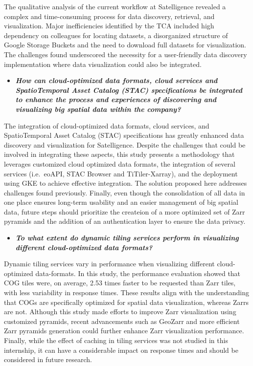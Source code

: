 \documentclass[
  oneside,
  open=any]{scrbook}
\providecommand{\tightlist}{%
  \setlength{\itemsep}{0pt}\setlength{\parskip}{0pt}}\usepackage{longtable,booktabs,array}
\begin{document}
The qualitative analysis of the current workflow at Satelligence
revealed a complex and time-consuming process for data discovery,
retrieval, and visualization. Major inefficiencies identified by the TCA
included high dependency on colleagues for locating datasets, a
disorganized structure of Google Storage Buckets and the need to
download full datasets for visualization. The challenges found
underscored the necessity for a user-friendly data discovery
implementation where data visualization could also be integrated.

\begin{itemize}
\tightlist
\item
  \textbf{\emph{How can cloud-optimized data formats, cloud services and
  SpatioTemporal Asset Catalog (STAC) specifications be integrated to
  enhance the process and experiences of discovering and visualizing big
  spatial data within the company?}}
\end{itemize}

The integration of cloud-optimized data formats, cloud services, and
SpatioTemporal Asset Catalog (STAC) specifications has greatly enhanced
data discovery and visualization for Satelligence. Despite the
challenges that could be involved in integrating these aspects, this
study presents a methodology that leverages customized cloud optimized
data formats, the integration of several services (i.e.~eoAPI, STAC
Browser and TiTiler-Xarray), and the deployment using GKE to achieve
effective integration. The solution proposed here addresses challenges
found previously. Finally, even though the consolidation of all data in
one place ensures long-term usability and an easier management of big
spatial data, future steps should prioritize the createion of a more
optimized set of Zarr pyramids and the addition of an authentication
layer to ensure the data privacy.

\begin{itemize}
\tightlist
\item
  \textbf{\emph{To what extent do dynamic tiling services perform in
  visualizing different cloud-optimized data formats?}}
\end{itemize}

Dynamic tiling services vary in performance when visualizing different
cloud-optimized data-formats. In this study, the performance evaluation
showed that COG tiles were, on average, 2.53 times faster to be
requested than Zarr tiles, with less variability in response times.
These results align with the understanding that COGs are specifically
optimized for spatial data visualization, whereas Zarrs are not.
Although this study made efforts to improve Zarr visualization using
customized pyramids, recent advancements such as GeoZarr and more
efficient Zarr pyramids generation could further enhance Zarr
visualization performance. Finally, while the effect of caching in
tiling services was not studied in this internship, it can have a
considerable impact on response times and should be considered in future
research.
\end{document}
